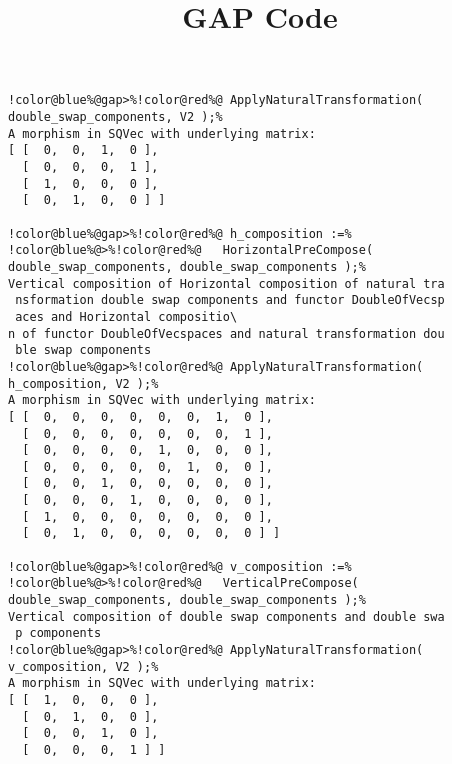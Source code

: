 \documentclass[12pt]{amsart}
\title{GAP Code}
\author{}
\begin{document}
\maketitle

\begin{Verbatim}[commandchars=!@\%,frame=single]
!color@blue%@gap>%!color@red%@ ApplyNaturalTransformation( double_swap_components, V2 );%
A morphism in SQVec with underlying matrix:
[ [  0,  0,  1,  0 ],
  [  0,  0,  0,  1 ],
  [  1,  0,  0,  0 ],
  [  0,  1,  0,  0 ] ]

!color@blue%@gap>%!color@red%@ h_composition :=%
!color@blue%@>%!color@red%@   HorizontalPreCompose( double_swap_components, double_swap_components );%
Vertical composition of Horizontal composition of natural tra
 nsformation double swap components and functor DoubleOfVecsp
 aces and Horizontal compositio\
n of functor DoubleOfVecspaces and natural transformation dou
 ble swap components
!color@blue%@gap>%!color@red%@ ApplyNaturalTransformation( h_composition, V2 );%
A morphism in SQVec with underlying matrix:
[ [  0,  0,  0,  0,  0,  0,  1,  0 ],
  [  0,  0,  0,  0,  0,  0,  0,  1 ],
  [  0,  0,  0,  0,  1,  0,  0,  0 ],
  [  0,  0,  0,  0,  0,  1,  0,  0 ],
  [  0,  0,  1,  0,  0,  0,  0,  0 ],
  [  0,  0,  0,  1,  0,  0,  0,  0 ],
  [  1,  0,  0,  0,  0,  0,  0,  0 ],
  [  0,  1,  0,  0,  0,  0,  0,  0 ] ]

!color@blue%@gap>%!color@red%@ v_composition :=%
!color@blue%@>%!color@red%@   VerticalPreCompose( double_swap_components, double_swap_components );%
Vertical composition of double swap components and double swa
 p components
!color@blue%@gap>%!color@red%@ ApplyNaturalTransformation( v_composition, V2 );%
A morphism in SQVec with underlying matrix:
[ [  1,  0,  0,  0 ],
  [  0,  1,  0,  0 ],
  [  0,  0,  1,  0 ],
  [  0,  0,  0,  1 ] ]

\end{Verbatim}
\end{document}
